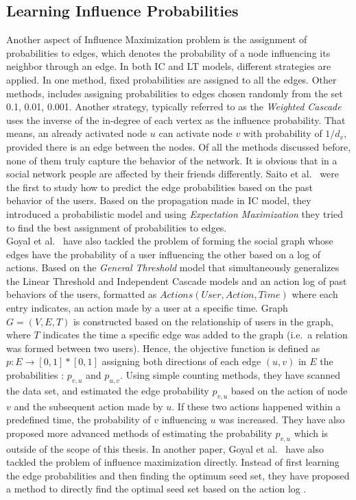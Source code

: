 \documentclass[english]{tktltiki}
\begin{document}
\subsection{Learning Influence Probabilities}
\label{subsec:learninginfprob}
Another aspect of Influence Maximization problem is the assignment of probabilities to edges, which denotes the probability of a node influencing its neighbor through an edge. In both IC and LT models, different strategies are applied. In one method, fixed probabilities are assigned to all the edges. Other methods, includes assigning probabilities to edges chosen randomly from the set {0.1, 0.01, 0.001}. Another strategy, typically referred to as the \textit{Weighted Cascade} uses the inverse of the in-degree of each vertex as the influence probability. That means, an already activated node $u$ can activate node $v$ with probability of $1/d_v$, provided there is an edge between the nodes. Of all the methods discussed before, none of them truly capture the behavior of the network. It is obvious that in a social network people are affected by their friends differently. Saito et al.\ \cite{saito08} were the first to study how to predict the edge probabilities based on the past behavior of the users. Based on the propagation made in IC model, they introduced a probabilistic model and using \textit{Expectation Maximization} they tried to find the best assignment of probabilities to edges. \\
Goyal et al.\ \cite{goyal10} have also tackled the problem of forming the social graph whose edges have the probability of a user influencing the other based on a log of actions. Based on the \textit{General Threshold} model that simultaneously 
generalizes the Linear Threshold and Independent Cascade models and an action log of past behaviors of the users, formatted as $Actions(User,Action, Time)$ where each entry indicates, an action made by a user at a specific time. 
Graph $G = (V,E,T)$ is constructed based on the relationship of users in the graph, where $T$ indicates the time a specific edge was added to the graph (i.e.\ a relation was formed between two users). Hence, the objective function is defined as $p : E \rightarrow [0,1] * [0,1]$ assigning both directions of each edge $(u,v)$ in $E$ the probabilities : $p_{v,u}$ and $p_{u,v}$.
Using simple counting methods, they have scanned the data set, and estimated the edge probability $p_{v,u}$ based on the action of node $v$ and the subsequent action made by $u$. If these two actions happened within a predefined time, the probability of $v$ influencing $u$ was increased. They have also proposed more advanced methods of estimating the probability $p_{v,u}$ which is outside of the scope of this thesis.
In another paper, Goyal et al.\ \cite{goyal11} have also tackled the problem of influence maximization directly. Instead of first learning the edge probabilities and then finding the optimum seed set, they have proposed a method to directly find the optimal seed set based on the action log .
\end{document}
